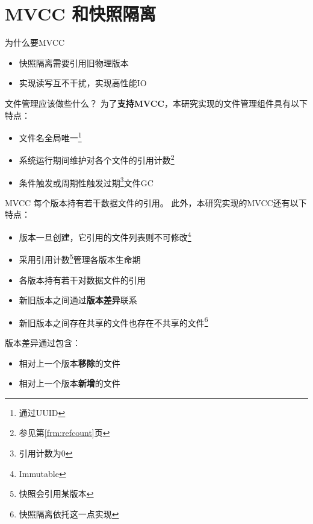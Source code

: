 \documentclass{beamer}
\begin{document}
\section{MVCC 和快照隔离}

\begin{frame}{为什么要MVCC}\label{frm:mvcc}
    \begin{itemize}
        \item 快照隔离需要引用旧物理版本
        \item 实现读写互不干扰，实现高性能IO
    \end{itemize}
\end{frame}

\begin{frame}{文件管理应该做些什么？}
    为了\textbf{支持MVCC}，本研究实现的文件管理组件具有以下特点：
    \begin{itemize}
        \item 文件名全局唯一\footnote{通过UUID}
        \item 系统运行期间维护对各个文件的引用计数\footnote{参见第\ref{frm:refcount}页}
        \item 条件触发或周期性触发过期\footnote{引用计数为0}文件GC
    \end{itemize}
\end{frame}

\begin{frame}{MVCC}
    每个版本持有若干数据文件的引用。
    此外，本研究实现的MVCC还有以下特点：
    \begin{itemize}
        \item 版本一旦创建，它引用的文件列表则不可修改\footnote{Immutable}
        \item 采用引用计数\footnote{快照会引用某版本}管理各版本生命期
        \item 各版本持有若干对数据文件的引用
        \item 新旧版本之间通过\textbf{版本差异}联系
        \item 新旧版本之间存在共享的文件也存在不共享的文件\footnote{快照隔离依托这一点实现}
    \end{itemize}

    版本差异通过包含：
    \begin{itemize}
        \item 相对上一个版本\textbf{移除}的文件
        \item 相对上一个版本\textbf{新增}的文件
    \end{itemize}
\end{frame}
\end{document}
